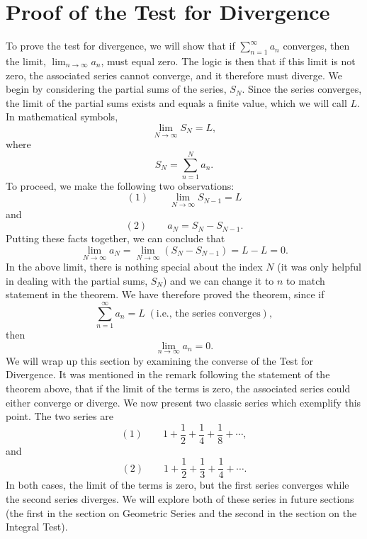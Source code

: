 \documentclass{ximera}
\begin{document}
\section{Proof of the Test for Divergence}
To prove the test for divergence, we will show that if $\displaystyle{\sum_{n=1}^\infty a_n}$ converges, then the limit, 
$\displaystyle{\lim_{n \to \infty} a_n}$, must equal zero. The logic is then that if this limit is not zero, 
the associated series cannot converge, and it therefore must diverge. We begin by considering the partial sums of the series, $S_N$.
Since the series converges, the limit of the partial sums exists and equals a finite value, which we will call $L$.
In mathematical symbols, 
\[
\lim_{N \to \infty} S_N = L, 
\]
where
\[
S_N = \sum_{n=1}^N a_n.
\]
To proceed, we make the following two observations:
\[
(1)\qquad \lim_{N \to \infty} S_{N-1} = L
\]
and 
\[
(2) \qquad a_N = S_N - S_{N-1}.
\]
Putting these facts together, we can conclude that
\[
\lim_{N \to \infty} a_N = \lim_{N \to \infty} (S_N - S_{N-1}) = L-L = 0.
\]
In the above limit, there is nothing special about the index $N$ (it was only helpful in dealing with the partial sums, $S_N$) 
and we can change it to $n$ to match statement in the theorem. We have therefore proved the theorem, since if 
\[
\sum_{n=1}^\infty a_n = L \; (\text{i.e., the series converges}),
\]
then 
\[
\lim_{n \to \infty} a_n = 0.
\]
We will wrap up this section by examining the converse of the Test for Divergence.
It was mentioned in the remark following the statement of the theorem above, that if the limit of the terms is zero,
the associated series could either converge or diverge.
We now present two classic series which exemplify this point.
The two series are
\[
(1)  \qquad 1 + \frac12 + \frac14 + \frac18 + \cdots,
\]
and 
\[
(2) \qquad 1 + \frac12 +  \frac13 + \frac14 + \cdots.
\]
In both cases, the limit of the terms is zero, but the first series converges while the second series diverges.
We will explore both of these series in future sections 
(the first in the section on Geometric Series and the second in the section on the Integral Test).





\begin{center}
\begin{foldable}
\end{foldable}
\end{center}
\end{document}
